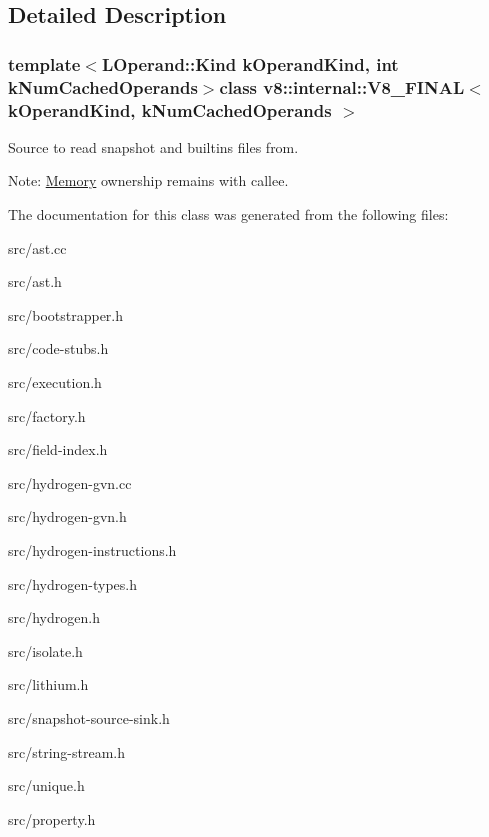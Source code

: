 \subsection{Detailed Description}
\subsubsection*{template$<$L\+Operand\+::\+Kind k\+Operand\+Kind, int k\+Num\+Cached\+Operands$>$class v8\+::internal\+::\+V8\+\_\+\+F\+I\+N\+A\+L$<$ k\+Operand\+Kind, k\+Num\+Cached\+Operands $>$}

Source to read snapshot and builtins files from.

Note\+: \hyperlink{classv8_1_1internal_1_1_memory}{Memory} ownership remains with callee. 

The documentation for this class was generated from the following files\+:\begin{DoxyCompactItemize}
\item 
src/ast.\+cc\item 
src/ast.\+h\item 
src/bootstrapper.\+h\item 
src/code-\/stubs.\+h\item 
src/execution.\+h\item 
src/factory.\+h\item 
src/field-\/index.\+h\item 
src/hydrogen-\/gvn.\+cc\item 
src/hydrogen-\/gvn.\+h\item 
src/hydrogen-\/instructions.\+h\item 
src/hydrogen-\/types.\+h\item 
src/hydrogen.\+h\item 
src/isolate.\+h\item 
src/lithium.\+h\item 
src/snapshot-\/source-\/sink.\+h\item 
src/string-\/stream.\+h\item 
src/unique.\+h\item 
src/property.\+h\end{DoxyCompactItemize}
